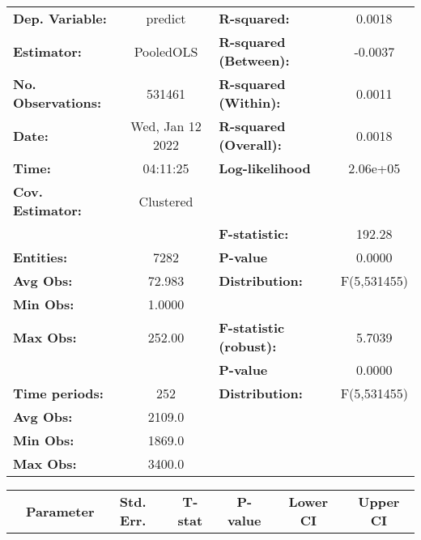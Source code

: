 \begin{center}
\begin{tabular}{lclc}
\toprule
\textbf{Dep. Variable:}    &      predict       & \textbf{  R-squared:         }   &      0.0018      \\
\textbf{Estimator:}        &     PooledOLS      & \textbf{  R-squared (Between):}  &     -0.0037      \\
\textbf{No. Observations:} &       531461       & \textbf{  R-squared (Within):}   &      0.0011      \\
\textbf{Date:}             &  Wed, Jan 12 2022  & \textbf{  R-squared (Overall):}  &      0.0018      \\
\textbf{Time:}             &      04:11:25      & \textbf{  Log-likelihood     }   &     2.06e+05     \\
\textbf{Cov. Estimator:}   &     Clustered      & \textbf{                     }   &                  \\
\textbf{}                  &                    & \textbf{  F-statistic:       }   &      192.28      \\
\textbf{Entities:}         &        7282        & \textbf{  P-value            }   &      0.0000      \\
\textbf{Avg Obs:}          &       72.983       & \textbf{  Distribution:      }   &   F(5,531455)    \\
\textbf{Min Obs:}          &       1.0000       & \textbf{                     }   &                  \\
\textbf{Max Obs:}          &       252.00       & \textbf{  F-statistic (robust):} &      5.7039      \\
\textbf{}                  &                    & \textbf{  P-value            }   &      0.0000      \\
\textbf{Time periods:}     &        252         & \textbf{  Distribution:      }   &   F(5,531455)    \\
\textbf{Avg Obs:}          &       2109.0       & \textbf{                     }   &                  \\
\textbf{Min Obs:}          &       1869.0       & \textbf{                     }   &                  \\
\textbf{Max Obs:}          &       3400.0       & \textbf{                     }   &                  \\
\bottomrule
\end{tabular}
\begin{tabular}{lcccccc}
                & \textbf{Parameter} & \textbf{Std. Err.} & \textbf{T-stat} & \textbf{P-value} & \textbf{Lower CI} & \textbf{Upper CI}  \\

\end{tabular}
\end{center}

